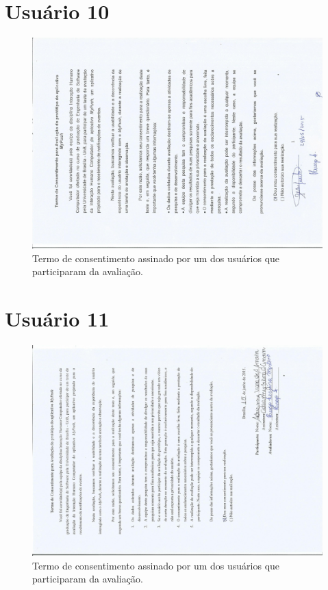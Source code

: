 \begin{anexosenv}
      \section*{Usuário 10}
    \begin{figure}[!htbp]
      \centering
      \includegraphics[scale=0.6, angle=-90]{editaveis/figuras/gesiel}
      \caption{Termo de consentimento assinado por um dos usuários que participaram da avaliação.}
      \label{termo_consentimento_1}
    \end{figure}
    
     \section*{Usuário 11}
    \begin{figure}[!htbp]
      \centering
      \includegraphics[scale=0.6, angle=-90]{editaveis/figuras/adrianny}
      \caption{Termo de consentimento assinado por um dos usuários que participaram da avaliação.}
      \label{termo_consentimento_1}
    \end{figure}
	

\end{anexosenv}
